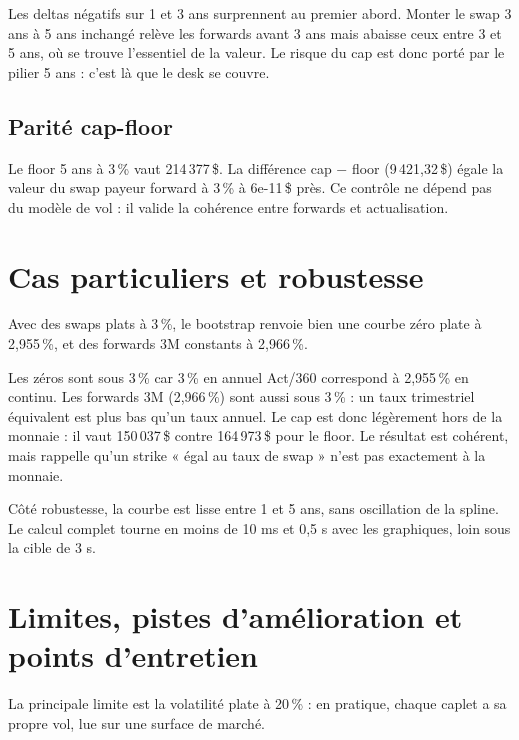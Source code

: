 \documentclass[11pt,a4paper]{article}
\begin{document}
Les deltas négatifs sur 1 et 3 ans surprennent au premier abord. Monter le swap 3 ans à 5 ans inchangé relève les forwards avant 3 ans mais abaisse ceux entre 3 et 5 ans, où se trouve l'essentiel de la valeur. Le risque du cap est donc porté par le pilier 5 ans : c'est là que le desk se couvre.

\subsection{Parité cap-floor}

Le floor 5 ans à 3\,\% vaut 214\,377\,\$. La différence cap $-$ floor (9\,421,32\,\$) égale la valeur du swap payeur forward à 3\,\% à 6e-11\,\$ près. Ce contrôle ne dépend pas du modèle de vol : il valide la cohérence entre forwards et actualisation.

\section{Cas particuliers et robustesse}
Avec des swaps plats à 3\,\%, le bootstrap renvoie bien une courbe zéro plate à 2,955\,\%, et des forwards 3M constants à 2,966\,\%.

Les zéros sont sous 3\,\% car 3\,\% en annuel Act/360 correspond à 2,955\,\% en continu. Les forwards 3M (2,966\,\%) sont aussi sous 3\,\% : un taux trimestriel équivalent est plus bas qu'un taux annuel. Le cap est donc légèrement hors de la monnaie : il vaut 150\,037\,\$ contre 164\,973\,\$ pour le floor. Le résultat est cohérent, mais rappelle qu'un strike « égal au taux de swap » n'est pas exactement à la monnaie.

Côté robustesse, la courbe est lisse entre 1 et 5 ans, sans oscillation de la spline. Le calcul complet tourne en moins de 10 ms et 0,5 s avec les graphiques, loin sous la cible de 3 s.

\section{Limites, pistes d'amélioration et points d'entretien}
La principale limite est la volatilité plate à 20\,\% : en pratique, chaque caplet a sa propre vol, lue sur une surface de marché.
\end{document}
